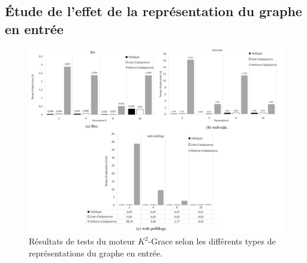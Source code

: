 	\subsection{Étude de l'effet de la représentation du graphe en entrée}
			
				\begin{figure}[H]
		\begin{center}
			
			\includegraphics[scale=0.4]{ressources/image/Tests/tst.png}
			\caption{Résultats de tests du moteur $K^2$-Grace selon les différents types de représentations du graphe en entrée.}
			\label{fig:test-rep}
		\end{center}
	\end{figure}
			
